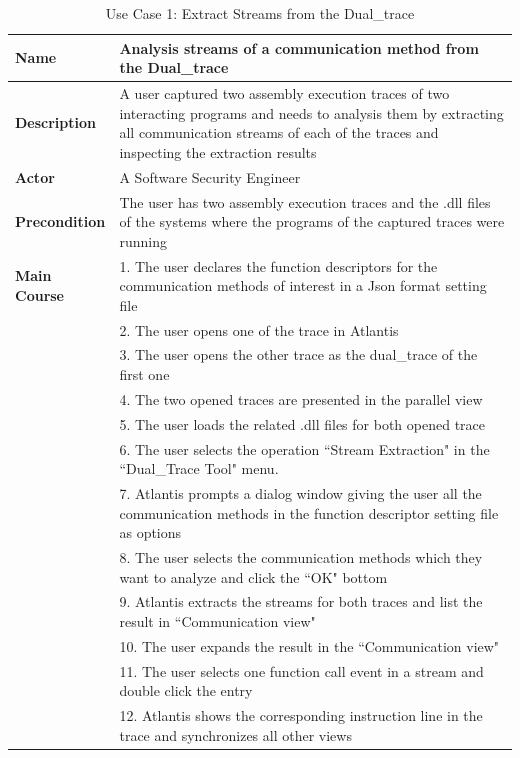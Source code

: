 \begin{table}[H]
  \centering
  \caption{Use Case 1: Extract Streams from the Dual\_trace}
  \label{usecase1}
  \begin{tabular}{|l|p{13cm}|}
      \hline
       \textbf{Name} & Analysis streams of a communication method from the Dual\_trace\\
       \hline
       \textbf{Description} & A user captured two assembly execution traces of two interacting programs and needs to analysis them by extracting all communication streams of each of the traces and inspecting the extraction results \\
       \hline
              \textbf{Actor} & A Software Security Engineer \\
       \hline
       \textbf{Precondition} & The user has two assembly execution traces and the .dll files of the systems where the programs of the captured traces were running\\
       \hline
       \textbf{Main Course}& 1. The user declares the function descriptors for the communication methods of interest in a Json format setting file\\
        & 2. The user opens one of the trace in Atlantis\\
       &  3. The user opens the other trace as the dual\_trace of the first one\\
       & 4. The two opened traces are presented in the parallel view\\
       & 5. The user loads the related .dll files for both opened trace\\
       & 6. The user selects the operation ``Stream Extraction" in the ``Dual\_Trace Tool" menu.\\
       & 7. Atlantis prompts a dialog window giving the user all the communication methods in the function descriptor setting file as options\\
       & 8. The user selects the communication methods which they want to analyze and click the ``OK" bottom\\
       & 9. Atlantis extracts the streams for both traces and list the result in ``Communication view"\\
       & 10. The user expands the result in the ``Communication view"\\
       & 11. The user selects one function call event in a stream and double click the entry\\
       & 12. Atlantis shows the corresponding instruction line in the trace and synchronizes all other views\\
      \hline               
  \end{tabular}
\end{table}

